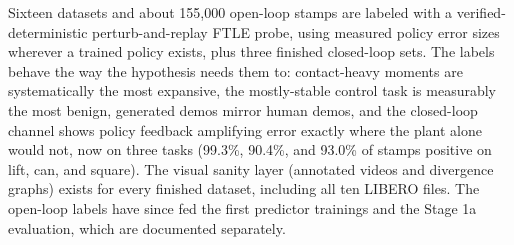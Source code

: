 \documentclass[11pt]{article}
\begin{document}
Sixteen datasets and about 155{,}000 open-loop stamps are labeled with a
verified-deterministic perturb-and-replay FTLE probe, using measured policy error
sizes wherever a trained policy exists, plus three finished closed-loop sets. The
labels behave the way the hypothesis needs them to: contact-heavy moments are
systematically the most expansive, the mostly-stable control task is measurably the
most benign, generated demos mirror human demos, and the closed-loop channel shows
policy feedback amplifying error exactly where the plant alone would not, now on
three tasks (99.3\%, 90.4\%, and 93.0\% of stamps positive on lift, can, and
square). The visual sanity layer (annotated videos and divergence graphs) exists
for every finished dataset, including all ten LIBERO files. The open-loop labels
have since fed the first predictor trainings and the Stage 1a evaluation, which are
documented separately.
\end{document}
